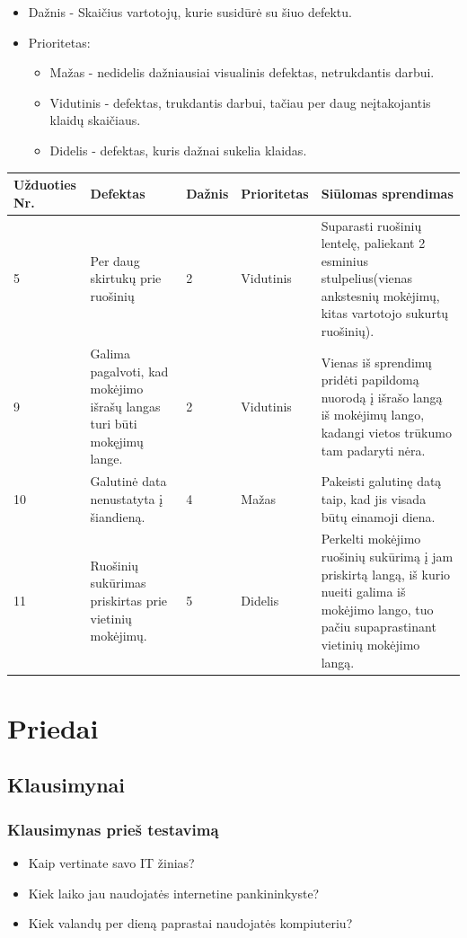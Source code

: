 \documentclass[oneside]{VUMIFPSkursinis}
\begin{document}
\begin{itemize}
	\item Dažnis - Skaičius vartotojų, kurie susidūrė su šiuo defektu.
	\item Prioritetas:
		\begin{itemize}
			\item Mažas - nedidelis dažniausiai visualinis defektas, netrukdantis darbui.
			\item Vidutinis - defektas, trukdantis darbui, tačiau per daug neįtakojantis klaidų skaičiaus.
			\item Didelis - defektas, kuris dažnai sukelia klaidas.
		\end{itemize}
\end{itemize}
\begin{center}
    \begin{tabular}{ |p{2cm}| p{4cm} | p{2cm} | p{2cm} | p{5cm} |}
    \hline
	Užduoties Nr.&Defektas&Dažnis&Prioritetas&Siūlomas sprendimas\\ \hline
	5&Per daug skirtukų prie ruošinių &2&Vidutinis&Suparasti ruošinių lentelę, paliekant 2 esminius stulpelius(vienas ankstesnių mokėjimų, kitas vartotojo sukurtų ruošinių). \\ \hline
	9&Galima pagalvoti, kad mokėjimo išrašų langas turi būti mokęjimų lange.&2&Vidutinis&Vienas iš sprendimų pridėti papildomą nuorodą į išrašo langą iš mokėjimų lango, kadangi vietos trūkumo tam padaryti nėra.\\ \hline
	10&Galutinė data nenustatyta į šiandieną.&4&Mažas&Pakeisti galutinę datą taip, kad jis visada būtų einamoji diena. \\ \hline
	11&Ruošinių sukūrimas priskirtas prie vietinių mokėjimų.&5&Didelis& Perkelti mokėjimo ruošinių sukūrimą į jam priskirtą langą, iš kurio nueiti galima iš mokėjimo lango, tuo pačiu supaprastinant vietinių mokėjimo langą. \\ \hline
    \end{tabular}
\end{center}

\section{Priedai}
\subsection{Klausimynai}
\subsubsection{Klausimynas prieš testavimą}
\begin{itemize}
	\item Kaip vertinate savo IT žinias?
	\item Kiek laiko jau naudojatės internetine pankininkyste?
	\item Kiek valandų per dieną paprastai naudojatės kompiuteriu?
\end{itemize}
\end{document}
